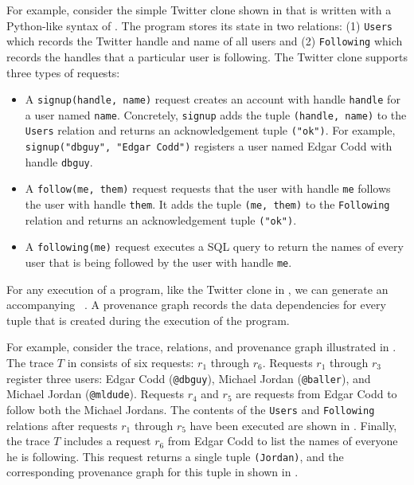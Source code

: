 For example, consider the simple Twitter clone shown in 
that is written with a Python-like syntax of \dedalusplus{}. The program stores
its state in two relations: (1) \texttt{Users} which records the Twitter handle
and name of all users and (2) \texttt{Following} which records the handles that
a particular user is following. The Twitter clone supports three types of
requests:
\begin{itemize}
  \item
    A \texttt{signup(handle, name)} request creates an account with handle
    \texttt{handle} for a user named \texttt{name}.  Concretely,
    \texttt{signup} adds the tuple \texttt{(handle, name)} to the
    \texttt{Users} relation and returns an acknowledgement tuple
    \texttt{("ok")}. For example, \texttt{signup("dbguy", "Edgar Codd")}
    registers a user named Edgar Codd with handle \texttt{dbguy}.
  \item
    A \texttt{follow(me, them)} request requests that the user with handle
    \texttt{me} follows the user with handle \texttt{them}. It adds the tuple
    \texttt{(me, them)} to the \texttt{Following} relation and returns an
    acknowledgement tuple \texttt{("ok")}.
  \item
    A \texttt{following(me)} request executes a SQL query to return the names
    of every user that is being followed by the user with handle \texttt{me}.
\end{itemize}

For any execution of a \dedalusplus{} program, like the Twitter clone in
, we can generate an accompanying ~\cite{alvaro2015lineage}. A provenance graph records the data
dependencies for every tuple that is created during the execution of the
program.

{}

For example, consider the trace, relations, and provenance graph illustrated in
. The trace $T$ in 
consists of six requests: $r_1$ through $r_6$. Requests $r_1$ through $r_3$
register three users: Edgar Codd (\texttt{@dbguy}), Michael Jordan
(\texttt{@baller}), and Michael Jordan (\texttt{@mldude}). Requests $r_4$ and
$r_5$ are requests from Edgar Codd to follow both the Michael Jordans.  The
contents of the \texttt{Users} and \texttt{Following} relations after requests
$r_1$ through $r_5$ have been executed are shown in
. Finally, the trace $T$ includes a request $r_6$
from Edgar Codd to list the names of everyone he is following. This request
returns a single tuple \texttt{(Jordan)}, and the corresponding provenance
graph for this tuple in shown in .

